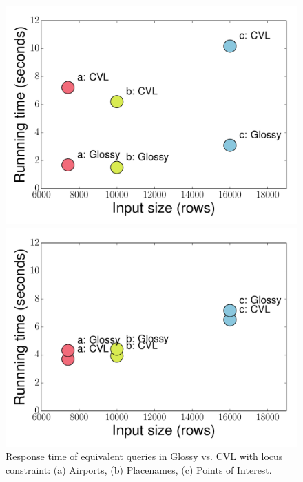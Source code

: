 \documentclass[11pt, oneside]{report}
\begin{document}
{\begin{figure}[!t]
     \begin{minipage}{0.32\linewidth}
        \centerline{\includegraphics[width=1\linewidth]{figs-glossy/comparison_glossy_vs_cvl_locus.pdf}}
        \vspace{-3ex}
        \caption{Response time of equivalent queries in Glossy vs. CVL with locus constraint: (a) Airports, (b) Placenames, (c) Points of Interest.}\label{fig:glossy:vs:cvl:locus}
    \end{minipage} \hfill
    \begin{minipage}{0.32\linewidth}
        \centerline{\includegraphics[width=1\linewidth]{figs-glossy/comparison_glossy_vs_cvl_pair.pdf}}
        \vspace{-3ex}

\end{minipage}
\end{figure}}
\end{document}
